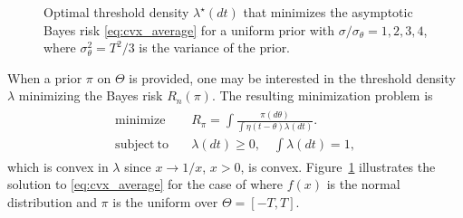 \begin{figure}
\begin{center}
\caption{\label{fig:opt_density}
Optimal threshold density $\lambda^\star(dt)$ that minimizes the asymptotic Bayes risk \eqref{eq:cvx_average} for a uniform prior with $\sigma/\sigma_\theta=1,2,3,4$, where $\sigma_\theta^2=T^2/3$ is the variance of the prior. 
}
\end{center}
\end{figure}

When a prior $\pi$ on $\Theta$ is provided, one may be interested in the threshold density $\lambda$ minimizing the Bayes risk $R_n(\pi)$. The resulting minimization problem is 
\begin{align}
\label{eq:cvx_average}
\begin{split}
\mathrm{minimize} \quad & R_{\pi} =  \int \frac{\pi(d\theta)}{ \int \eta \left( t-\theta\right) \lambda(dt)}. \\ 
\mathrm{subject~to} \quad & \lambda(dt)\geq 0,\quad \int \lambda(dt) =1, 
\end{split}
\end{align}
which is convex in $\lambda$ since $x \rightarrow 1/x$, $x>0$, is convex. Figure~\ref{fig:opt_density}  illustrates the solution to \eqref{eq:cvx_average} for the case of where $f(x)$ is the normal distribution and $\pi$ is the uniform over $\Theta = [-T,T]$. %

